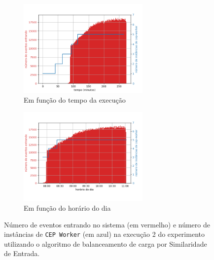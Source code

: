 \begin{figure}[h]
\centering
\begin{subfigure}{\textwidth}
\centering
\includegraphics[width=0.7\textwidth]{figuras/graphics/carga_e_workers_total7-dez-is.png}
\caption{Em função do tempo da execução}
\label{fig:workers_and_load_total-7-dez-is}
\end{subfigure}%

\begin{subfigure}{\textwidth}
\centering
\includegraphics[width=0.7\textwidth]{figuras/graphics/carga_e_workers_horario7-dez-is.png}
\caption{Em função do horário do dia}
\label{fig:workers_and_load_SPtrans-7-dez-is}
\end{subfigure}%
\caption{Número de eventos entrando no sistema (em vermelho) e número de instâncias de \texttt{CEP Worker} (em azul) na execução 2 do experimento utilizando o algoritmo de balanceamento de carga por Similaridade de Entrada.}
\end{figure}








